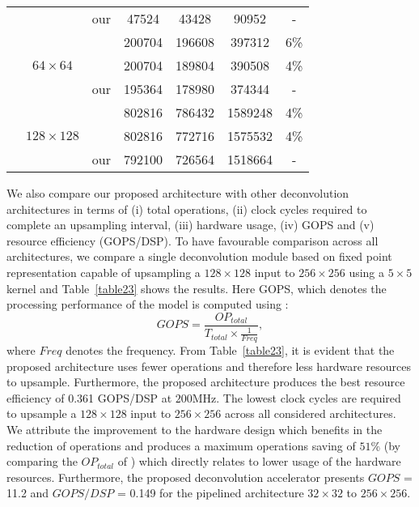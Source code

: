 \documentclass[journal]{IEEEtran}
\begin{document}
\begin{table}[h]
{\begin{tabular}{ccccccc}
 &   & our & 47524 & 43428 & 90952 & - \\ \cline{2-7} 
 &   & \cite{article4}\cite{article14} & 200704 & 196608 & 397312 & 6\% \\
 & $64 \times 64$ & \cite{article3} & 200704 & 189804 & 390508 & 4\% \\
 &   & our & 195364 & 178980 & 374344 & -\\ \cline{2-7} 
 &   & \cite{article4}\cite{article14} & 802816 & 786432 & 1589248 & 4\% \\
 & $128 \times 128$ & \cite{article3} & 802816 & 772716 & 1575532 & 4\% \\
 &   & our & 792100 & 726564 & 1518664 &- \\ \hline
\end{tabular}}
\end{table}

We also compare our proposed architecture with other deconvolution architectures in terms of (i) total operations, (ii) clock cycles required to complete an upsampling interval, (iii) hardware usage, (iv) GOPS and (v) resource efficiency (GOPS/DSP). To have favourable comparison across all architectures, we compare a single deconvolution module based on fixed point representation capable of upsampling a $128\times128$ input to $256\times256$ using a $5\times5$ kernel and Table~\ref{table23} shows the results. Here GOPS, which denotes the processing performance of the model is computed using \cite{inproceedings2}:
\begin{equation}
    GOPS = \frac{OP_{total}}{T_{total} \times \frac{1}{Freq}} ,
\end{equation}
where $Freq$ denotes the frequency. From Table~\ref{table23}, it is evident that the proposed architecture uses fewer operations and  therefore less hardware resources to upsample. Furthermore, the proposed architecture produces the best resource efficiency of 0.361 GOPS/DSP at $200$MHz. The lowest clock cycles are required to upsample a $128\times 128$ input to $256\times256$ across all considered architectures. We attribute the improvement to the hardware design which benefits in the reduction of operations and produces a maximum operations saving of $51\% $ (by comparing the $OP_{total}$ of \cite{inproceedings2}) which directly relates to lower usage of the hardware resources. Furthermore,  the proposed deconvolution accelerator presents $GOPS$ = 11.2 and $GOPS/DSP$ = 0.149 for the pipelined architecture $32\times32$ to $256\times256$.
 
 
 
\end{document}

